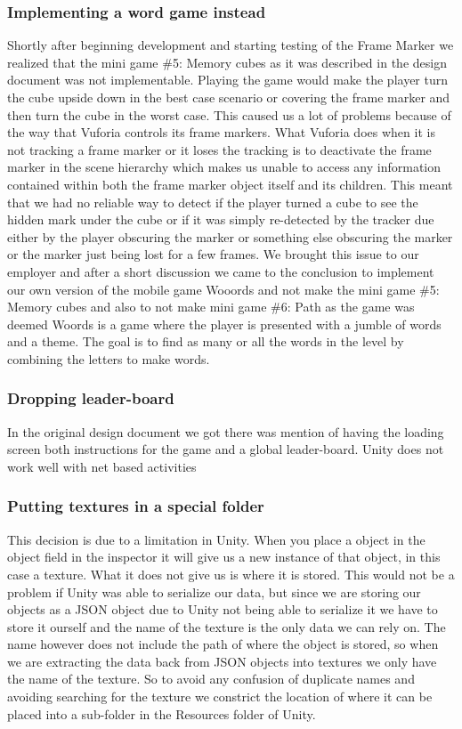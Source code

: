 \subsubsection{Implementing a word game instead}
Shortly after beginning development and starting testing of the \gls{Frame Marker} we realized that the mini game \#5: Memory cubes as it was described in the design document was not implementable. Playing the game would make the player turn the cube upside down in the best case scenario or covering the frame marker and then turn the cube in the worst case. This caused us a lot of problems because of the way that Vuforia controls its frame markers. What Vuforia does when it is not tracking a frame marker or it loses the tracking is to deactivate the frame marker in the scene hierarchy which makes us unable to access any information contained within both the frame marker object itself and its children. This meant that we had no reliable way to detect if the player turned a cube to see the hidden mark under the cube or if it was simply re-detected by the tracker due either by the player obscuring the marker or something else obscuring the marker or the marker just being lost for a few frames. We brought this issue to our employer and after a short discussion we came to the conclusion to implement our own version of the mobile game Wooords and not make the mini game \#5: Memory cubes and also to not make mini game \#6: Path as the game was deemed %
Woords is a game where the player is presented with a jumble of words and a theme. The goal is to find as many or all the words in the level by combining the letters to make words.


\subsubsection{Dropping leader-board}
In the original design document we got there was mention of having the loading screen both instructions for the game and a global leader-board. Unity does not work well with net based activities 

\subsubsection{Putting textures in a special folder}
This decision is due to a limitation in Unity. When you place a object in the object field in the inspector it will give us a new instance of that object, in this case a texture. What it does not give us is where it is stored. This would not be a problem if Unity was able to serialize our data, but since we are storing our objects as a JSON object due to Unity not being able to serialize it we have to store it ourself and the name of the texture is the only data we can rely on. The name however does not include the path of where the object is stored, so when we are extracting the data back from JSON objects into textures we only have the name of the texture. So to avoid any confusion of duplicate names and avoiding searching for the texture we constrict the location of where it can be placed into a sub-folder in the Resources folder of Unity.

